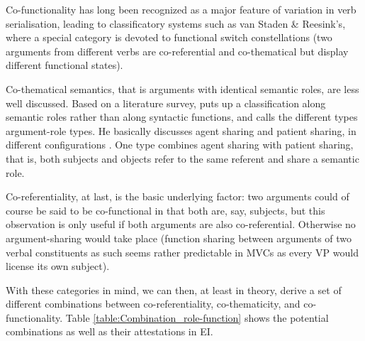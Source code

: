 Co-functionality has long been recognized as a major feature of variation in verb serialisation, leading to classificatory systems such as van Staden \& Reesink's, where a special category is devoted to functional switch constellations (two arguments from different verbs are co-referential and co-thematical but display different functional states). 

Co-thematical semantics, that is arguments with identical semantic roles, are less well discussed. Based on a literature survey, \citet{haspelmath2016serial} puts up a classification along semantic roles rather than along syntactic functions, and calls the different types argument-role types. He basically discusses agent sharing and patient sharing, in different configurations \citep[3ff.]{haspelmath2016serial}. One type combines agent sharing with patient sharing, that is, both subjects and objects refer to the same referent and share a semantic role.

Co-referentiality, at last, is the basic underlying factor: two arguments could of course be said to be co-functional in that both are, say, subjects, but this observation is only useful if both arguments are also co-referential. Otherwise no argument-sharing would take place (function sharing between arguments of two verbal constituents as such seems rather predictable in MVCs as every VP would license its own subject). 

With these categories in mind, we can then, at least in theory, derive a set of different combinations between co-referentiality, co-thematicity, and co-functionality. Table \ref{table:Combination_role-function} shows the potential combinations as well as their attestations in EI.

\begin{table}
\caption[Combination types of semantic role and syntactic function in shared MVC arguments]{Combination types of semantic role and syntactic function in shared MVC arguments.}
\label{table:Combination_role-function}
\end{table}

